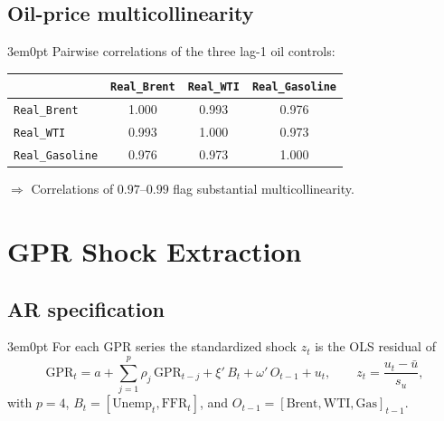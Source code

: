 \documentclass[12pt]{article}
\newenvironment{bodyL2}{\begin{adjustwidth}{3em}{0pt}}{\end{adjustwidth}}
\begin{document}
\subsection{Oil-price multicollinearity}
\begin{bodyL2}
Pairwise correlations of the three lag-1 oil controls:

\begin{center}
\begin{tabular}{lccc}
\toprule
                        & \texttt{Real\_Brent} & \texttt{Real\_WTI} & \texttt{Real\_Gasoline} \\
\midrule
\texttt{Real\_Brent}    & 1.000 & 0.993 & 0.976 \\
\texttt{Real\_WTI}      & 0.993 & 1.000 & 0.973 \\
\texttt{Real\_Gasoline} & 0.976 & 0.973 & 1.000 \\
\bottomrule
\end{tabular}
\end{center}

\smallskip
$\Rightarrow$ Correlations of $0.97$--$0.99$ flag substantial multicollinearity.
\end{bodyL2}

\section{GPR Shock Extraction}
\label{sec:shock}

\subsection{AR specification}
\begin{bodyL2}
For each GPR series the standardized shock $z_t$ is the OLS residual of
\begin{equation}
    \text{GPR}_t
    = a
    + \sum_{j=1}^{p} \rho_j\, \text{GPR}_{t-j}
    + \xi'\, B_t
    + \omega'\, O_{t-1}
    + u_t,
    \qquad
    z_t = \frac{u_t - \bar u}{s_u},
    \label{eq:shock}
\end{equation}
with $p = 4$, $B_t = [\text{Unemp}_t, \text{FFR}_t]$, and
$O_{t-1} = [\text{Brent}, \text{WTI}, \text{Gas}]_{t-1}$.
\end{bodyL2}
\end{document}
